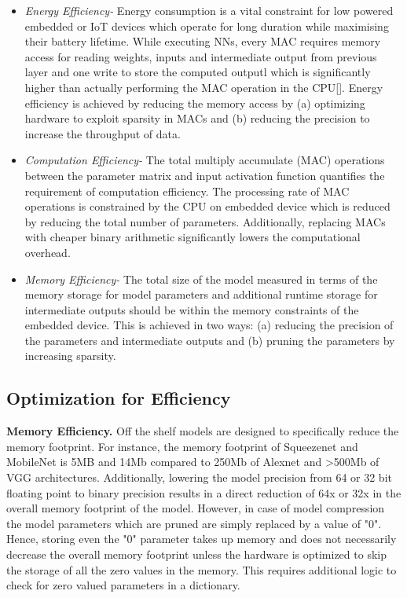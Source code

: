 \begin{itemize}[leftmargin=*]
\item {\em Energy Efficiency-} Energy consumption is a vital constraint for low powered embedded or IoT devices which operate for long duration while maximising their battery lifetime.
While executing NNs, every MAC requires memory access for reading weights, inputs and intermediate output from previous layer and one write to store the computed outputl which is significantly higher than actually performing the MAC operation in the CPU[].
Energy efficiency is achieved by reducing the memory access by (a) optimizing hardware to exploit sparsity in MACs and (b) reducing the precision to increase the throughput of data.

\item {\em Computation Efficiency-} The total multiply accumulate (MAC) operations between the parameter matrix and input activation function quantifies the requirement of computation efficiency.
The processing rate of MAC operations is constrained by the CPU on embedded device which is reduced by reducing the total number of parameters.
Additionally, replacing MACs with cheaper binary arithmetic significantly lowers the computational overhead.

\item {\em Memory Efficiency-} The total size of the model measured in terms of the memory storage for model parameters and additional runtime storage for intermediate outputs should be within the memory constraints of the embedded device.
This is achieved in two ways: (a) reducing the precision of the parameters and intermediate outputs and (b) pruning the parameters by increasing sparsity.
\end{itemize}

\subsection{Optimization for Efficiency}


\noindent\textbf{Memory Efficiency.} Off the shelf models are designed to specifically reduce the memory footprint.
For instance, the memory footprint of Squeezenet and MobileNet is 5MB and 14Mb compared to 250Mb of Alexnet and >500Mb of VGG architectures.
Additionally, lowering the model precision from 64 or 32 bit floating point to binary precision results in a direct reduction of 64x or 32x in the overall memory footprint of the model.
However, in case of model compression the model parameters which are pruned are simply replaced by a value of "0".
Hence, storing even the "0" parameter takes up memory and does not necessarily decrease the overall memory footprint unless the hardware is optimized to skip the storage of all the zero values in the memory.
This requires additional logic to check for zero valued parameters in a dictionary.

